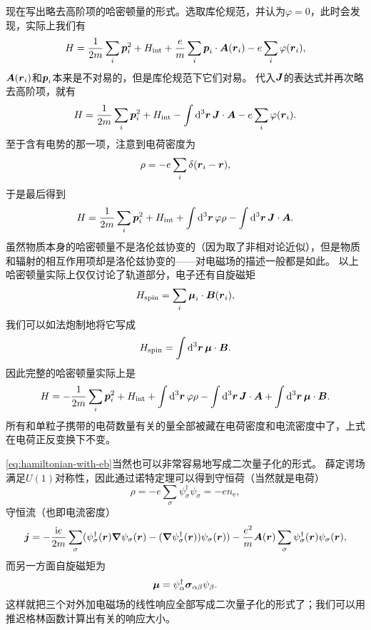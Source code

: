 \documentclass[hyperref, UTF8, a4paper]{ctexart}
\newcommand*{\ii}{\mathrm{i}}
\begin{document}
现在写出略去高阶项的哈密顿量的形式。选取库伦规范，并认为$\varphi=0$，此时会发现，实际上我们有
\[
    {H} = \frac{1}{2m} \sum_i {\vb*{p}}_i^2 + {H}_\text{int} + \frac{e}{m} \sum_i {\vb*{p}}_i \cdot \vb*{A}({\vb*{r}}_i) - e \sum_i \varphi({\vb*{r}_i}),
\]
$\vb*{A}({\vb*{r}}_i)$和${\vb*{p}}_i$本来是不对易的，但是库伦规范下它们对易。
代入${\vb*{J}}$的表达式并再次略去高阶项，就有
\[
    {H} = \frac{1}{2m} \sum_i {\vb*{p}}_i^2 + {H}_\text{int} - \int \dd[3]{\vb*{r}} {\vb*{J}} \cdot \vb*{A} - e \sum_i \varphi({\vb*{r}_i}).
\]
至于含有电势的那一项，注意到电荷密度为
\[
    {\rho} = - e \sum_{i} \delta({\vb*{r}}_i - \vb*{r}),
\]
于是最后得到
\begin{equation}
    {H} = \frac{1}{2m} \sum_i {\vb*{p}}_i^2 + {H}_\text{int} + \int \dd[3]{\vb*{r}} \varphi {\rho} - \int \dd[3]{\vb*{r}} {\vb*{J}} \cdot \vb*{A}.
\end{equation}
虽然物质本身的哈密顿量不是洛伦兹协变的（因为取了非相对论近似），但是物质和辐射的相互作用项却是洛伦兹协变的——对电磁场的描述一般都是如此。
以上哈密顿量实际上仅仅讨论了轨道部分，电子还有自旋磁矩
\[
    {H}_{\text{spin}} = \sum_i {\vb*{\mu}}_i \cdot \vb*{B}({\vb*{r}}_i),
\]
我们可以如法炮制地将它写成
\[
    {H}_{\text{spin}} = \int \dd[3]{\vb*{r}} {\vb*{\mu}} \cdot \vb*{B}.
\]
因此完整的哈密顿量实际上是
\begin{equation}
    {H} = - \frac{1}{2m} \sum_i {\vb*{p}}_i^2 + {H}_\text{int} + \int \dd[3]{\vb*{r}} \varphi {\rho} - \int \dd[3]{\vb*{r}} {\vb*{J}} \cdot \vb*{A} + \int \dd[3]{\vb*{r}} {\vb*{\mu}} \cdot \vb*{B}.
    \label{eq:hamiltonian-with-eb}
\end{equation}
所有和单粒子携带的电荷数量有关的量全部被藏在电荷密度和电流密度中了，上式在电荷正反变换下不变。

\eqref{eq:hamiltonian-with-eb}当然也可以非常容易地写成二次量子化的形式。
薛定谔场满足$U(1)$对称性，因此通过诺特定理可以得到守恒荷（当然就是电荷）
\begin{equation}
    \rho = - e \sum_\sigma {\psi}^\dagger_\sigma {\psi}_\sigma = - e {n}_\text{e},
\end{equation}
守恒流（也即电流密度）
\begin{equation}
    {\vb*{j}} = - \frac{\ii e}{2m} \sum_\sigma ({\psi}_\sigma^\dagger(\vb*{r}) \grad{{\psi}_\sigma}(\vb*{r}) - (\grad{{\psi}_\sigma^\dagger}(\vb*{r})) {\psi}_\sigma(\vb*{r})) - \frac{e^2}{m} \vb*{A}(\vb*{r}) \sum_\sigma {\psi}^\dagger_\sigma(\vb*{r}) {\psi}_\sigma(\vb*{r}),
\end{equation}
而另一方面自旋磁矩为
\begin{equation}
    {\vb*{\mu}} = {\psi}^\dagger_\alpha \vb*{\sigma}_{\alpha \beta} {\psi}_\beta.
\end{equation}
这样就把三个对外加电磁场的线性响应全部写成二次量子化的形式了；我们可以用推迟格林函数计算出有关的响应大小。
\end{document}
